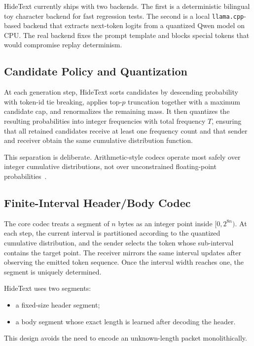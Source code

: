 \documentclass[sigconf,review,anonymous]{acmart}
\begin{document}
HideText currently ships with two backends. The first is a deterministic bilingual toy character backend for fast regression tests. The second is a local \texttt{llama.cpp}-based backend that extracts next-token logits from a quantized Qwen model on CPU. The real backend fixes the prompt template and blocks special tokens that would compromise replay determinism.

\subsection{Candidate Policy and Quantization}

At each generation step, HideText sorts candidates by descending probability with token-id tie breaking, applies top-\(p\) truncation together with a maximum candidate cap, and renormalizes the remaining mass. It then quantizes the resulting probabilities into integer frequencies with total frequency \(T\), ensuring that all retained candidates receive at least one frequency count and that sender and receiver obtain the same cumulative distribution function.

This separation is deliberate. Arithmetic-style codecs operate most safely over integer cumulative distributions, not over unconstrained floating-point probabilities~\cite{witten1987arithmetic}.

\subsection{Finite-Interval Header/Body Codec}

The core codec treats a segment of \(n\) bytes as an integer point inside \([0, 2^{8n})\). At each step, the current interval is partitioned according to the quantized cumulative distribution, and the sender selects the token whose sub-interval contains the target point. The receiver mirrors the same interval updates after observing the emitted token sequence. Once the interval width reaches one, the segment is uniquely determined.

HideText uses two segments:

\begin{itemize}
    \item a fixed-size header segment;
    \item a body segment whose exact length is learned after decoding the header.
\end{itemize}

This design avoids the need to encode an unknown-length packet monolithically.
\end{document}
